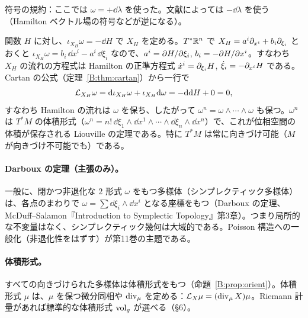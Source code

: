 符号の規約：ここでは $\omega=+\dd\lambda$ を使った。文献によっては $-\dd\lambda$ を使う（Hamilton ベクトル場の符号などが逆になる）。

\begin{ex}\label{B:ex:hamilton}
関数 $H$ に対し、$\iota_{X_H}\omega=-\dd H$ で $X_H$ を定める。$T^*\mathbb R^n$ で $X_H=a^i\partial_{x^i}+b_i\partial_{\xi_i}$ とおくと $\iota_{X_H}\omega=b_i\,\dd x^i-a^i\,\dd\xi_i$ なので、$a^i=\partial H/\partial\xi_i$, $b_i=-\partial H/\partial x^i$。すなわち $X_H$ の流れの方程式は Hamilton の正準方程式 $\dot x^i=\partial_{\xi_i}H$, $\dot\xi_i=-\partial_{x^i}H$ である。Cartan の公式（定理~\ref{B:thm:cartan}）から一行で
\[
\mathcal L_{X_H}\omega=\mathrm{d}\iota_{X_H}\omega+\iota_{X_H}\mathrm{d}\omega=-\mathrm{d}\mathrm{d} H+0=0 ,
\]
すなわち Hamilton の流れは $\omega$ を保ち、したがって $\omega^n=\omega\wedge\cdots\wedge\omega$ も保つ。$\omega^n$ は $T^*M$ の体積形式（$\omega^n=n!\,\dd\xi_1\wedge\dd x^1\wedge\cdots\wedge\dd\xi_n\wedge\dd x^n$）で、これが位相空間の体積が保存される Liouville の定理である。特に $T^*M$ は常に向きづけ可能（$M$ が向きづけ不可能でも）である。
\end{ex}

\paragraph{Darboux の定理（主張のみ）。}一般に、閉かつ非退化な $2$ 形式 $\omega$ をもつ多様体（シンプレクティック多様体）は、各点のまわりで $\omega=\sum\dd\xi_i\wedge\dd x^i$ となる座標をもつ（Darboux の定理\tC、McDuff--Salamon『Introduction to Symplectic Topology』第3章）。つまり局所的な不変量はなく、シンプレクティック幾何は大域的である。Poisson 構造への一般化（非退化性をはずす）が第11巻の主題である。

\paragraph{体積形式。}すべての向きづけられた多様体は体積形式をもつ（命題~\ref{B:prop:orient}）。体積形式 $\mu$ は、$\mu$ を保つ微分同相や $\operatorname{div}_\mu$ を定める：$\mathcal L_X\mu=(\operatorname{div}_\mu X)\mu$。Riemann 計量があれば標準的な体積形式 $\mathrm{vol}_g$ が選べる（§6）。

